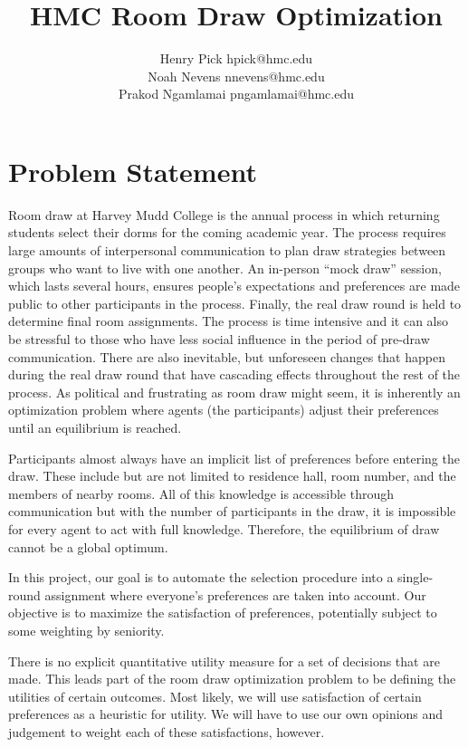 \documentclass[12pt]{article}
\author{Henry Pick \small hpick@hmc.edu \\
\large Noah Nevens \small nnevens@hmc.edu \\
\large Prakod Ngamlamai \small pngamlamai@hmc.edu}
\title{HMC Room Draw Optimization}
\begin{document}
    \maketitle
    \section*{Problem Statement}
    Room draw at Harvey Mudd College is the annual process in which returning students select their dorms for the coming academic year. The process requires large amounts of interpersonal communication to plan  draw strategies between groups who want to live with one another. An in-person ``mock draw'' session, which lasts several hours, ensures people's expectations and preferences are made public to other participants in the process. Finally, the real draw round is held to determine final room assignments. The process is time intensive and it can also be stressful to those who have less social influence in the period of pre-draw communication. There are also inevitable, but unforeseen changes that happen during the real draw round that have cascading effects throughout the rest of the process. As political and frustrating as room draw might seem, it is inherently an optimization problem where agents (the participants) adjust their preferences until an equilibrium is reached. 

    Participants almost always have an implicit list of preferences before entering the draw. These include but are not limited to residence hall, room number, and the members of nearby rooms. All of this knowledge is accessible through communication but with the number of participants in the draw, it is impossible for every agent to act with full knowledge. Therefore, the equilibrium of draw cannot be a global optimum.
    
    In this project, our goal is to automate the selection procedure into a single-round assignment where everyone's preferences are taken into account. Our objective is to maximize the satisfaction of preferences, potentially subject to some weighting by seniority.
    
    There is no explicit quantitative utility measure for a set of decisions that are made. This leads part of the room draw optimization problem to be defining the utilities of certain outcomes. Most likely, we will use satisfaction of certain preferences as a heuristic for utility. We will have to use our own opinions and judgement to weight each of these satisfactions, however.
\end{document}

